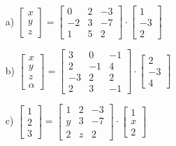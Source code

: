\documentclass{article}
\begin{document}
\section{}
\begin{itemize}
\item [a)] $\begin{bmatrix} 
			x \\ y \\ z
			\end{bmatrix}
			=
			\begin{bmatrix} 
			0  & 2 &-3 \\ 
			-2 & 3 &-7 \\ 
			1  & 5 & 2
			\end{bmatrix}
			\cdot
			\begin{bmatrix} 
			1 \\ -3 \\ 2
			\end{bmatrix}$
\item [b)] $\begin{bmatrix} 
			x \\ y \\ z \\ \alpha 
			\end{bmatrix}
			=
			\begin{bmatrix} 
			3  & 0 &-1 \\ 
			2 & -1 &4 \\ 
			-3  & 2 & 2 \\
			2  & 3 & -1
			\end{bmatrix}
			\cdot
			\begin{bmatrix} 
			2 \\ -3 \\ 4
			\end{bmatrix}$
\item [c)] $\begin{bmatrix} 
			1 \\ 2 \\ 3
			\end{bmatrix}
			=
			\begin{bmatrix} 
			1  & 2 &-3 \\ 
			y & 3 &-7 \\ 
			2  & z & 2
			\end{bmatrix}
			\cdot
			\begin{bmatrix} 
			1 \\ x \\ 2
			\end{bmatrix}$


\end{itemize}
\end{document}
